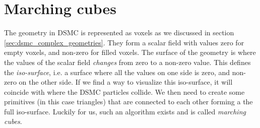 \section{Marching cubes}
\label{sec:marching_cubes}
The geometry in DSMC is represented as voxels as we discussed in section \ref{sec:dsmc_complex_geometries}. They form a scalar field with values zero for empty voxels, and non-zero for filled voxels. The surface of the geometry is where the values of the scalar field \textit{changes} from zero to a non-zero value. This defines the \textit{iso-surface}, i.e. a surface where all the values on one side is zero, and non-zero on the other side. If we find a way to visualize this iso-surface, it will coincide with where the DSMC particles collide. We then need to create some primitives (in this case triangles) that are connected to each other forming a the full iso-surface. Luckily for us, such an algorithm exists and is called \textit{marching cubes}.

